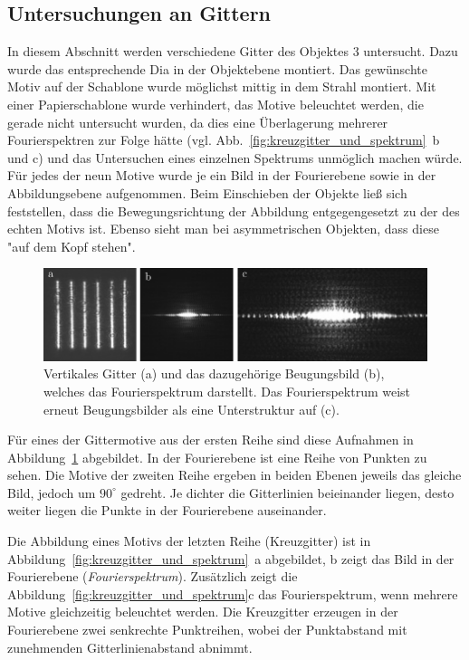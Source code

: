 


\subsection{Untersuchungen an Gittern}
In diesem Abschnitt werden verschiedene Gitter des Objektes 3 untersucht. Dazu wurde das entsprechende Dia in der Objektebene montiert. Das gewünschte Motiv auf der Schablone wurde möglichst mittig in dem Strahl montiert. Mit einer Papierschablone wurde verhindert, das Motive beleuchtet werden, die gerade nicht untersucht wurden, da dies eine Überlagerung mehrerer Fourierspektren zur Folge hätte (vgl. Abb.~\ref{fig:kreuzgitter_und_spektrum}~b und c) und das Untersuchen eines einzelnen Spektrums unmöglich machen würde. Für jedes der neun Motive wurde je ein Bild in der Fourierebene sowie in der Abbildungsebene aufgenommen. Beim Einschieben der Objekte ließ sich feststellen, dass die Bewegungsrichtung der Abbildung entgegengesetzt zu der des echten Motivs ist. Ebenso sieht man bei asymmetrischen Objekten, dass diese "auf dem Kopf stehen".


\begin{figure}[ht]
	\centering
	\includegraphics{images/Regina/abb13.pdf}
	\caption[Gitter mit Fourierspektrum]{
		Vertikales Gitter (a) und das dazugehörige Beugungsbild (b), welches das Fourierspektrum darstellt. Das Fourierspektrum weist erneut Beugungsbilder als eine Unterstruktur auf (c).
	}
	\label{fig:gitter_und_spektrum}
\end{figure}

Für eines der Gittermotive aus der ersten Reihe sind diese Aufnahmen in Abbildung~\ref{fig:gitter_und_spektrum} abgebildet. In der Fourierebene ist eine Reihe von Punkten zu sehen. Die Motive der zweiten Reihe ergeben in beiden Ebenen jeweils das gleiche Bild, jedoch um $90^\circ$ gedreht. Je dichter die Gitterlinien beieinander liegen, desto weiter liegen die Punkte in der Fourierebene auseinander.

Die Abbildung eines Motivs der letzten Reihe (Kreuzgitter) ist in Abbildung~\ref{fig:kreuzgitter_und_spektrum}~a abgebildet, b zeigt das Bild in der Fourierebene (\textit{Fourierspektrum}). Zusätzlich zeigt die Abbildung~\ref{fig:kreuzgitter_und_spektrum}c das Fourierspektrum, wenn mehrere Motive gleichzeitig beleuchtet werden. Die Kreuzgitter erzeugen in der Fourierebene zwei senkrechte Punktreihen, wobei der Punktabstand mit zunehmenden Gitterlinienabstand abnimmt.

